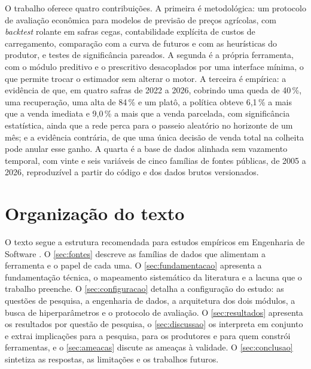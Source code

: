 O trabalho oferece quatro contribuições. A primeira é metodológica: um protocolo de avaliação econômica para modelos de previsão de preços agrícolas, com \textit{backtest} rolante em safras cegas, contabilidade explícita de custos de carregamento, comparação com a curva de futuros e com as heurísticas do produtor, e testes de significância pareados. A segunda é a própria ferramenta, com o módulo preditivo e o prescritivo desacoplados por uma interface mínima, o que permite trocar o estimador sem alterar o motor. A terceira é empírica: a evidência de que, em quatro safras de 2022 a 2026, cobrindo uma queda de 40\,\%, uma recuperação, uma alta de 84\,\% e um platô, a política obteve 6,1\,\% a mais que a venda imediata e 9,0\,\% a mais que a venda parcelada, com significância estatística, ainda que a rede perca para o passeio aleatório no horizonte de um mês; e a evidência contrária, de que uma única decisão de venda total na colheita pode anular esse ganho. A quarta é a base de dados alinhada sem vazamento temporal, com vinte e seis variáveis de cinco famílias de fontes públicas, de 2005 a 2026, reproduzível a partir do código e dos dados brutos versionados.

\section{Organização do texto}

O texto segue a estrutura recomendada para estudos empíricos em Engenharia de Software \cite{Wohlin2012}. O \autoref{sec:fontes} descreve as famílias de dados que alimentam a ferramenta e o papel de cada uma. O \autoref{sec:fundamentacao} apresenta a fundamentação técnica, o mapeamento sistemático da literatura e a lacuna que o trabalho preenche. O \autoref{sec:configuracao} detalha a configuração do estudo: as questões de pesquisa, a engenharia de dados, a arquitetura dos dois módulos, a busca de hiperparâmetros e o protocolo de avaliação. O \autoref{sec:resultados} apresenta os resultados por questão de pesquisa, o \autoref{sec:discussao} os interpreta em conjunto e extrai implicações para a pesquisa, para os produtores e para quem constrói ferramentas, e o \autoref{sec:ameacas} discute as ameaças à validade. O \autoref{sec:conclusao} sintetiza as respostas, as limitações e os trabalhos futuros.
